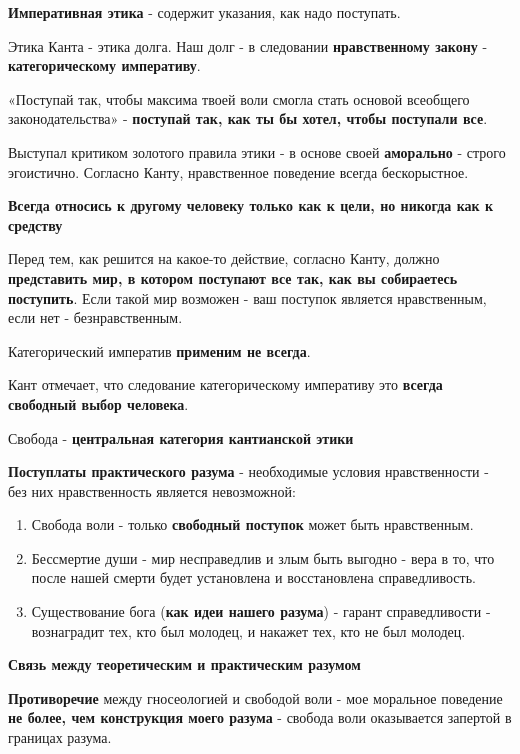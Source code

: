 \documentclass{article}
\begin{document}
\begin{flushleft}
\textbf{Императивная этика} - содержит указания, как надо поступать.

Этика Канта - этика долга. Наш долг - в следовании \textbf{нравственному закону} - \textbf{категорическому императиву}.

«Поступай так, чтобы максима твоей воли смогла стать основой всеобщего законодательства» - \textbf{поступай так, как ты бы хотел, чтобы поступали все}.

Выступал критиком золотого правила этики - в основе своей \textbf{аморально} - строго эгоистично. Согласно Канту, нравственное поведение всегда бескорыстное.

\textbf{Всегда относись к другому человеку только как к цели, но никогда как к средству}

\hfill

Перед тем, как решится на какое-то действие, согласно Канту, должно \textbf{представить мир, в котором поступают все так, как вы собираетесь поступить}. Если такой мир возможен - ваш поступок является нравственным, если нет - безнравственным.

Категорический императив \textbf{применим не всегда}.

Кант отмечает, что следование категорическому императиву это \textbf{всегда свободный выбор человека}.

Свобода - \textbf{центральная категория кантианской этики}

\textbf{Поступлаты практического разума} - необходимые условия нравственности - без них нравственность является невозможной:

\begin{enumerate}
    \item Свобода воли - только \textbf{свободный поступок} может быть нравственным.
    \item Бессмертие души - мир несправедлив и злым быть выгодно - вера в то, что после нашей смерти будет установлена и восстановлена справедливость.
    \item Существование бога (\textbf{как идеи нашего разума}) - гарант справедливости - вознаградит тех, кто был молодец, и накажет тех, кто не был молодец.
\end{enumerate}

\hfill

\textbf{Связь между теоретическим и практическим разумом}

\textbf{Противоречие} между гносеологией и свободой воли - мое моральное поведение \textbf{не более, чем конструкция моего разума} - свобода воли оказывается запертой в границах разума.


\end{flushleft}
\end{document}
